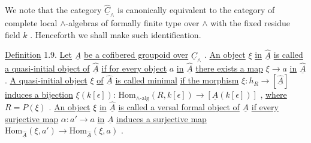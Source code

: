 \begin{center}
\end{center}
We note that the category  $\widehat{\underline{C}}_\wedge$  is canonically equivalent to the category of complete local $\wedge$-algebras of formally finite type over  $\wedge$  with the fixed residue field  $k$  . Henceforth we shall make such identification.

\underline{Definition} 1.9.   \underline{Let}  $\underline{A}$  \underline{be a cofibered groupoid over}  $\underline{C}_\wedge$  . \underline{An object}  $\xi$  \underline{in} $\widehat{\underline{A}}$  \underline{is called a quasi-initial object of}  $\widehat{\underline{A}}$  \underline{if for every object}  $a$  \underline{in}  $\widehat{\underline{A}}$  \underline{there exists a map}  $\xi \to a$  \underline{in}  $\widehat{\underline{A}}$  . \underline{A quasi-initial object}  $\xi$  \underline{of}  $\widehat{\underline{A}}$  \underline{is called minimal}
\underline{if the morphism}  $\xi : h_R \to [\hat{\underline{A}}]$  \underline{induces a bijection} $\xi(k[\epsilon])$: $\mathrm{Hom}_{\wedge\text{-alg}}(R,k[\epsilon]) \to [\underline{A}(k[\epsilon])]$ , \underline{where} $R = P(\xi)$ . \underline{An object} $\xi$ \underline{in} $\hat{\underline{A}}$ \underline{is called a versal formal object of} $\underline{A}$ \underline{if every surjective map} $\alpha : a' \to a$ \underline{in} $\underline{A}$ \underline{induces a surjective map} $\mathrm{Hom}_{\hat{\underline{A}}}(\xi,a') \to \mathrm{Hom}_{\hat{\underline{A}}}(\xi,a)$ .

